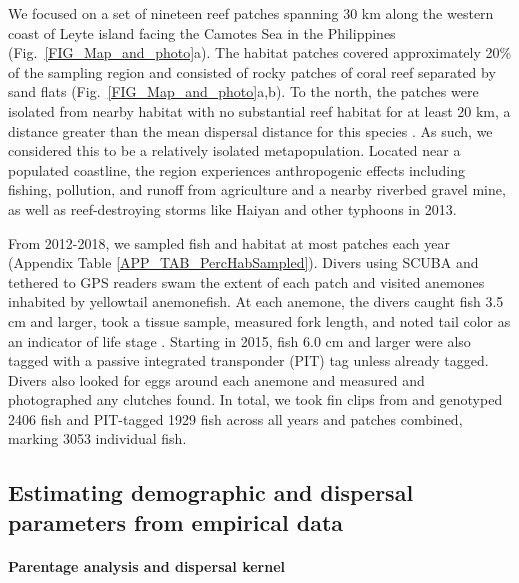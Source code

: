 \documentclass[12pt, oneside]{article}   	%
\begin{document}
We focused on a set of nineteen reef patches spanning 30 km along the western coast of Leyte island facing the Camotes Sea in the Philippines (Fig.\ \ref{FIG_Map_and_photo}a). The habitat patches covered approximately 20\% of the sampling region and consisted of rocky patches of coral reef separated by sand flats (Fig.\ \ref{FIG_Map_and_photo}a,b). To the north, the patches were isolated from nearby habitat with no substantial reef habitat for at least 20 km, a distance greater than the mean dispersal distance for this species \citep{pinsky2010using}. As such, we considered this to be a relatively isolated metapopulation. Located near a populated coastline, the region experiences anthropogenic effects including fishing, pollution, and runoff from agriculture and a nearby riverbed gravel mine, as well as reef-destroying storms like Haiyan and other typhoons in 2013.%

From 2012-2018, we sampled fish and habitat at most patches each year (Appendix Table \ref{APP_TAB_PercHabSampled}). Divers using SCUBA and tethered to GPS readers swam the extent of each patch and visited anemones inhabited by yellowtail anemonefish. At each anemone, the divers caught fish 3.5 cm and larger, took a tissue sample, measured fork length, and noted tail color as an indicator of life stage \citep{moyer1976geographical}. Starting in 2015, fish 6.0 cm and larger were also tagged with a passive integrated transponder (PIT) tag unless already tagged. Divers also looked for eggs around each anemone and measured and photographed any clutches found. In total, we took fin clips from and genotyped 2406 fish and PIT-tagged 1929 fish across all years and patches combined, marking 3053 individual fish. %

\subsection*{Estimating demographic and dispersal parameters from empirical data} 

\paragraph*{Parentage analysis and dispersal kernel}  %
\end{document}
